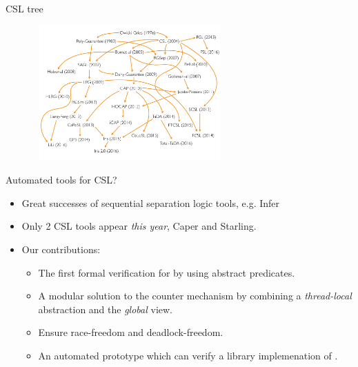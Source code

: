 \documentclass[11pt]{beamer}
\begin{document}
\begin{frame}{CSL tree}
  \begin{figure}
  	\includegraphics[width=20em,height=14em]{./images/CSL-Family-Tree.pdf}
  \end{figure}
\end{frame}


\begin{frame}{Automated tools for CSL?}
  \begin{itemize}
  \item Great successes of sequential separation logic tools, e.g. Infer
  \item Only 2 CSL tools appear \textit{this year}, Caper and Starling.
    \pause
  \item Our contributions:
    \begin{itemize}
    \item The first formal verification for {\CDL} by using abstract predicates.
    \item A modular solution to the counter mechanism by combining a
      \textit{thread-local} abstraction and the \textit{global} view.
    \item Ensure race-freedom and deadlock-freedom.
    \item An automated prototype which can verify a library implemenation of {\CDL}.
    \end{itemize}
  \end{itemize}
 \end{frame}
\end{document}
